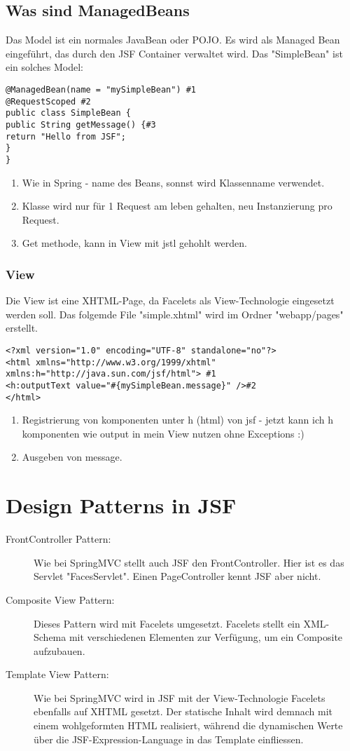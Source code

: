 \documentclass[a4paper,10pt]{scrreprt}
\begin{document}
{\subsection{Was sind ManagedBeans}
Das Model ist ein normales JavaBean oder POJO. Es wird als Managed Bean eingeführt, das durch
den JSF Container verwaltet wird. Das "SimpleBean" ist ein solches Model:
\begin{lstlisting}[caption=Managed Bean Beispiel]
 @ManagedBean(name = "mySimpleBean") #1
@RequestScoped #2
public class SimpleBean {
public String getMessage() {#3
return "Hello from JSF";
}
}
\end{lstlisting}
\begin{enumerate}
 \item Wie in Spring - name des Beans, sonnst wird Klassenname verwendet.
 \item Klasse wird nur für 1 Request am leben gehalten, neu Instanzierung pro Request.
 \item Get methode, kann in View mit jstl gehohlt werden.
\end{enumerate}

\subsubsection{View}
Die View ist eine XHTML-Page, da Facelets als View-Technologie eingesetzt werden soll. Das
folgemde File "simple.xhtml" wird im Ordner "webapp/pages" erstellt.
\begin{lstlisting}[caption= Grundlegende View Beispiel]
 <?xml version="1.0" encoding="UTF-8" standalone="no"?>
<html xmlns="http://www.w3.org/1999/xhtml"
xmlns:h="http://java.sun.com/jsf/html"> #1
<h:outputText value="#{mySimpleBean.message}" />#2
</html>
\end{lstlisting}
\begin{enumerate}
 \item Registrierung von komponenten unter h (html) von jsf - jetzt kann ich h komponenten wie output in mein View nutzen ohne Exceptions :)
 \item Ausgeben von message.
\end{enumerate}
\section{Design Patterns in JSF}
\begin{description}
 \item [FrontController Pattern:] Wie bei SpringMVC stellt auch JSF den FrontController. Hier ist es das
Servlet "FacesServlet". Einen PageController kennt JSF aber nicht.
\item [Composite View Pattern:] Dieses Pattern wird mit Facelets umgesetzt. Facelets stellt ein XML-
Schema mit verschiedenen Elementen zur Verfügung, um ein Composite aufzubauen.
\item [Template View Pattern:] Wie bei SpringMVC wird in JSF mit der View-Technologie Facelets
ebenfalls auf XHTML gesetzt. Der statische Inhalt wird demnach mit einem wohlgeformten HTML
realisiert, während die dynamischen Werte über die JSF-Expression-Language in das Template
einfliessen.
\end{description}
}
\end{document}
